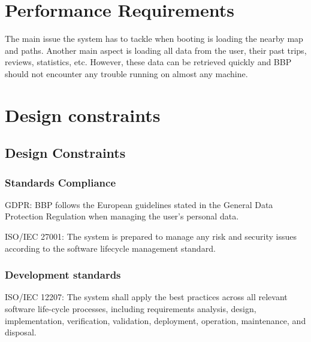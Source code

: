 \newpage
\section{Performance Requirements}
\label{sec:performance_requirements}%

The main issue the system has to tackle when booting is loading the nearby map and paths. Another main aspect is loading all data from the user, their past trips, reviews, statistics, etc. However, these data can be retrieved quickly and BBP should not encounter any trouble running on almost any machine.


\newpage
\section{Design constraints}
\label{sec:design_constraints}%


\subsection{Design Constraints}
\label{subsec:design_constraints}%

\subsubsection*{Standards Compliance}
\raggedright
GDPR: BBP follows the European guidelines stated in the General Data Protection Regulation when managing the user's personal data.

ISO/IEC 27001: The system is prepared to manage any risk and security issues according to the software lifecycle management standard.

\subsubsection*{Development standards}
ISO/IEC 12207: The system shall apply the best practices across all relevant software life-cycle processes, including requirements analysis, design, implementation, verification, validation, deployment, operation, maintenance, and disposal.


